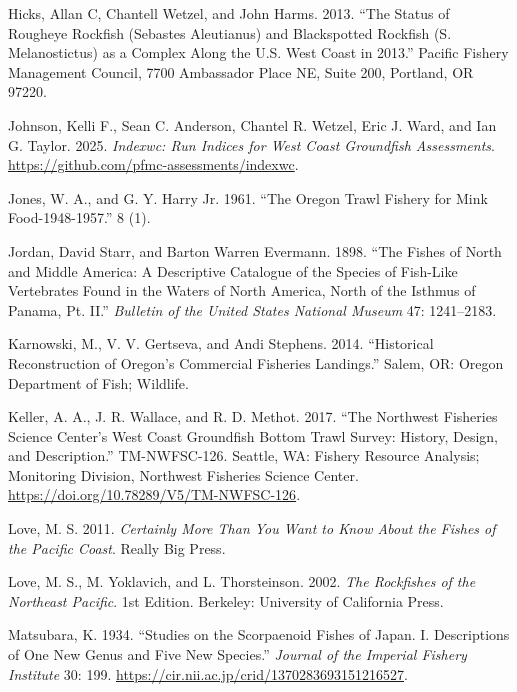 \documentclass[
]{scrartcl}
\newlength{\cslhangindent}
\newenvironment{CSLReferences}[2] %
 {\begin{list}{}{%
  \setlength{\itemindent}{0pt}
  \setlength{\leftmargin}{0pt}
  \setlength{\parsep}{0pt}
  \ifodd #1
   \setlength{\leftmargin}{\cslhangindent}
   \setlength{\itemindent}{-1\cslhangindent}
  \fi
  \setlength{\itemsep}{#2\baselineskip}}}
 {\end{list}}
\begin{document}
\begin{CSLReferences}{1}{0}
Hicks, Allan C, Chantell Wetzel, and John Harms. 2013. {``The Status of
Rougheye Rockfish ({Sebastes} Aleutianus) and Blackspotted Rockfish
({S}. Melanostictus) as a Complex Along the {U}.{S}. {West} {Coast} in
2013.''} Pacific Fishery Management Council, 7700 Ambassador Place NE,
Suite 200, Portland, OR 97220.

Johnson, Kelli F., Sean C. Anderson, Chantel R. Wetzel, Eric J. Ward,
and Ian G. Taylor. 2025. \emph{Indexwc: Run Indices for West Coast
Groundfish Assessments}.
\url{https://github.com/pfmc-assessments/indexwc}.

Jones, W. A., and G. Y. Harry Jr. 1961. {``The {Oregon} {Trawl}
{Fishery} for {Mink} {Food}-1948-1957.''} 8 (1).

Jordan, David Starr, and Barton Warren Evermann. 1898. {``The Fishes of
{North} and {Middle} {America}: {A} Descriptive Catalogue of the Species
of Fish-Like Vertebrates Found in the Waters of {North} {America}, North
of the {Isthmus} of {Panama}, Pt. {II}.''} \emph{Bulletin of the United
States National Museum} 47: 1241--2183.

Karnowski, M., V. V. Gertseva, and Andi Stephens. 2014. {``Historical
{Reconstruction} of {Oregon}'s {Commercial} {Fisheries} {Landings}.''}
Salem, OR: Oregon Department of Fish; Wildlife.

Keller, A. A., J. R. Wallace, and R. D. Methot. 2017. {``The {N}orthwest
{F}isheries {S}cience {C}enter's West Coast Groundfish Bottom Trawl
Survey: History, Design, and Description.''} TM-NWFSC-126. Seattle, WA:
Fishery Resource Analysis; Monitoring Division, Northwest Fisheries
Science Center. \url{https://doi.org/10.78289/V5/TM-NWFSC-126}.

Love, M. S. 2011. \emph{Certainly {More} {Than} {You} {Want} to {Know}
{About} the {Fishes} of the {Pacific} {Coast}}. Really Big Press.

Love, M. S., M. Yoklavich, and L. Thorsteinson. 2002. \emph{The
{Rockfishes} of the {Northeast} {Pacific}}. 1st Edition. Berkeley:
University of California Press.

Matsubara, K. 1934. {``Studies on the Scorpaenoid Fishes of Japan. I.
Descriptions of One New Genus and Five New Species.''} \emph{Journal of
the Imperial Fishery Institute} 30: 199.
\url{https://cir.nii.ac.jp/crid/1370283693151216527}.


\end{CSLReferences}
\end{document}
